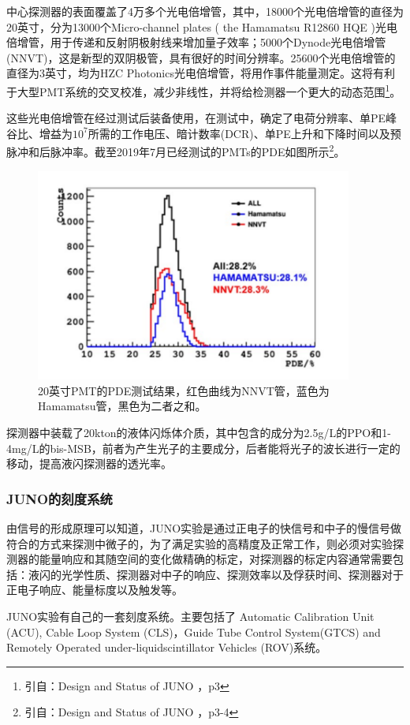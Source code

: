 \documentclass[10pt,a4paper]{article}
\begin{document}
中心探测器的表面覆盖了4万多个光电倍增管，其中，18000个光电倍增管的直径为20英寸，分为13000个Micro-channel plates ( the Hamamatsu R12860 HQE )光电倍增管，用于传递和反射阴极射线来增加量子效率；5000个Dynode光电倍增管(NNVT)，这是新型的双阴极管，具有很好的时间分辨率。25600个光电倍增管的直径为3英寸，均为HZC Photonics光电倍增管，将用作事件能量测定。这将有利于大型PMT系统的交叉校准，减少非线性，并将给检测器一个更大的动态范围\footnote{引自：Design and Status of JUNO ，p3}。

这些光电倍增管在经过测试后装备使用，在测试中，确定了电荷分辨率、单PE峰谷比、增益为$10^7$所需的工作电压、暗计数率(DCR)、单PE上升和下降时间以及预脉冲和后脉冲率。截至2019年7月已经测试的PMTs的PDE如图所示\footnote{引自：Design and Status of JUNO ，p3-4}。

\begin{figure}[ht]
 \centering
 \includegraphics[height=7cm]{images/pmt测试.png}
 \caption{20英寸PMT的PDE测试结果，红色曲线为NNVT管，蓝色为Hamamatsu管，黑色为二者之和。}
 \label{fig:singleblock}
\end{figure}

探测器中装载了20kton的液体闪烁体介质，其中包含的成分为2.5g/L的PPO和1-4mg/L的bis-MSB，前者为产生光子的主要成分，后者能将光子的波长进行一定的移动，提高液闪探测器的透光率。

\subsubsection{JUNO的刻度系统}\label{sub:logicinter}
由信号的形成原理可以知道，JUNO实验是通过正电子的快信号和中子的慢信号做符合的方式来探测中微子的，为了满足实验的高精度及正常工作，则必须对实验探测器的能量响应和其随空间的变化做精确的标定，对探测器的标定内容通常需要包括：液闪的光学性质、探测器对中子的响应、探测效率以及俘获时间、探测器对于正电子响应、能量标度以及触发等。

JUNO实验有自己的一套刻度系统。主要包括了 Automatic Calibration Unit (ACU),
Cable Loop System (CLS)，Guide Tube Control System(GTCS) and Remotely Operated under-liquidscintillator Vehicles (ROV)系统。
\end{document}
